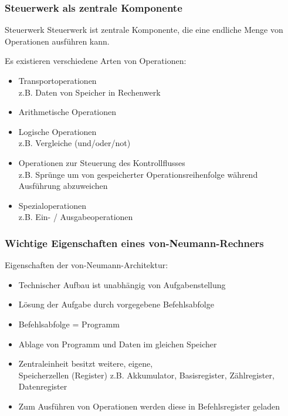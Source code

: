 \begin{frame}[fragile]
	\frametitle{Steuerwerk als zentrale Komponente}
	\begin{block}{Steuerwerk}
		Steuerwerk ist zentrale Komponente, die eine endliche Menge von Operationen
		ausführen kann.
	\end{block}
	\small
	Es existieren verschiedene Arten von Operationen:
	\begin{itemize}
	  \item Transportoperationen \\ 
	  z.B. Daten von Speicher in Rechenwerk
	  \item Arithmetische Operationen
	  \item Logische Operationen \\ 
	  z.B. Vergleiche (und/oder/not)
	  \item Operationen zur Steuerung des Kontrollflusses \\ 
	  z.B. Sprünge um von
	  gespeicherter Operationsreihenfolge während Ausführung abzuweichen
	  \item Spezialoperationen \\
	  z.B. Ein- / Ausgabeoperationen
	\end{itemize}
\end{frame} 

\begin{frame}[fragile]
	\frametitle{Wichtige Eigenschaften eines von-Neumann-Rechners}
	Eigenschaften der von-Neumann-Architektur:
	\begin{itemize}
	  \item Technischer Aufbau ist unabhängig von Aufgabenstellung
	  \item Lösung der Aufgabe durch vorgegebene Befehlsabfolge
	  \item Befehlsabfolge = Programm
	  \item Ablage von Programm und Daten im gleichen Speicher
	  \item Zentraleinheit besitzt weitere, eigene,\\ Speicherzellen (Register)
	  z.B. Akkumulator, Basisregister, Zählregister, Datenregister
	  \item Zum Ausführen von Operationen werden diese in Befehlsregister geladen
	\end{itemize}
\end{frame} 

